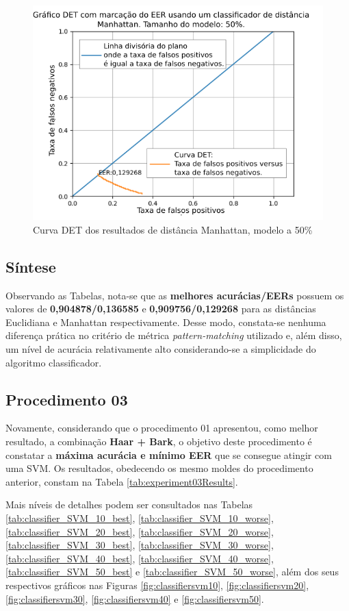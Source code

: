 \begin{figure}[!ht]
	\centering
	\includegraphics[width=.9\linewidth]{images/results/det/DET_for_classifier_Manhattan_50}
	\caption{Curva DET dos resultados de distância Manhattan, modelo a 50\%}
	\label{fig:detforclassifiermanhattan50}
\end{figure}

\subsection{Síntese}
\par Observando as Tabelas, nota-se que as \textbf{melhores acurácias/EERs} possuem os valores de \textbf{0,904878/0,136585} e \textbf{0,909756/0,129268} para as distâncias Euclidiana e Manhattan respectivamente. Desse modo, constata-se nenhuma diferença prática no critério de métrica \textit{pattern-matching} utilizado e, além disso, um nível de acurácia relativamente alto considerando-se a simplicidade do algoritmo classificador.

\subsection{Procedimento 03}
\label{chap:testsResults:sec:Experimento03}
\par Novamente, considerando que o procedimento 01 apresentou, como melhor resultado, a combinação \textbf{Haar + Bark}, o objetivo deste procedimento é constatar a \textbf{máxima acurácia e mínimo EER} que se consegue atingir com uma SVM. Os resultados, obedecendo os mesmo moldes do procedimento anterior, constam na Tabela \ref{tab:experiment03Results}.

\par Mais níveis de detalhes podem ser consultados nas Tabelas \ref{tab:classifier_SVM_10_best}, \ref{tab:classifier_SVM_10_worse}, \ref{tab:classifier_SVM_20_best}, \ref{tab:classifier_SVM_20_worse}, \ref{tab:classifier_SVM_30_best}, \ref{tab:classifier_SVM_30_worse}, \ref{tab:classifier_SVM_40_best}, \ref{tab:classifier_SVM_40_worse}, \ref{tab:classifier_SVM_50_best} e \ref{tab:classifier_SVM_50_worse}, além dos seus respectivos gráficos nas Figuras \ref{fig:classifiersvm10}, \ref{fig:classifiersvm20}, \ref{fig:classifiersvm30}, \ref{fig:classifiersvm40} e \ref{fig:classifiersvm50}.

